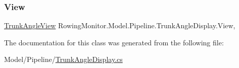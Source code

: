 \mbox{\label{class_rowing_monitor_1_1_model_1_1_pipeline_1_1_trunk_angle_display_ac0578beabcf4ec767137c3e7b9d50493}} 
\subsubsection{\texorpdfstring{View}{View}}
{\footnotesize\ttfamily \hyperlink{class_rowing_monitor_1_1_view_1_1_trunk_angle_view}{Trunk\+Angle\+View} Rowing\+Monitor.\+Model.\+Pipeline.\+Trunk\+Angle\+Display.\+View\hspace{0.3cm}{\ttfamily [get]}, {\ttfamily [set]}}



The documentation for this class was generated from the following file\+:\begin{DoxyCompactItemize}
\item 
Model/\+Pipeline/\hyperlink{_trunk_angle_display_8cs}{Trunk\+Angle\+Display.\+cs}\end{DoxyCompactItemize}
